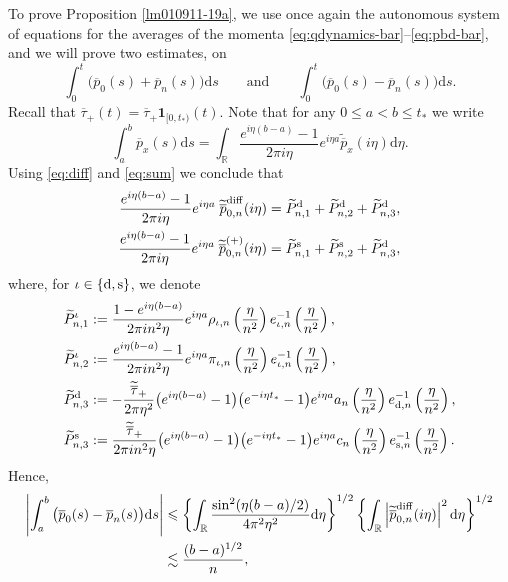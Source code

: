 \documentclass[EJP]{ejpecp} %
\newcommand\R{{\mathbb R}}
\renewcommand{\le}{\leqslant}
\newcommand{\dd  }{\mathrm{d}}
\renewcommand{\tilde}{\widetilde}
\renewcommand{\bar}{\overline}
\numberwithin{equation}{section}
\begin{document}
To prove Proposition \ref{lm010911-19a}, we use once again the autonomous system of equations for the averages of the momenta \eqref{eq:qdynamics-bar}--\eqref{eq:pbd-bar}, and we will prove two estimates, on 
\[\int_0^t\big(\bar p_0(s)+\bar p_n(s)\big)\dd s \qquad \text{and}\qquad \int_0^t\big(\bar p_0(s)-\bar p_n(s)\big)\dd s.\]
Recall that $\bar\tau_+(t)=\bar \tau_+\mathbf{1}_{[0,t_*)}(t)$. Note that for
any $0\le a<b\le t_*$ we write
\begin{equation}
\label{012412-19z}
\int_a^b\bar p_x(s)\dd s=\int_{\R}\frac{e^{i\eta
    (b-a)}-1}{2\pi i\eta}e^{i\eta a}\tilde{\bar p}_x(i\eta)\dd \eta.
\end{equation}
Using \eqref{eq:diff} and \eqref{eq:sum} we conclude that
\begin{align*}
  \frac{e^{i\eta
    (b-a)}-1}{2\pi i\eta}e^{i\eta a}\;\tilde{\bar p}^{\rm diff}_{0,n}(i\eta) & =\tilde
    P_{n,1}^{\rm d}+\tilde P_{n,2}^{\rm d}+\tilde
    P_{n,3}^{\rm d}, \\
    \frac{e^{i\eta
    (b-a)}-1}{2\pi i\eta}e^{i\eta a}\;\tilde{\bar p}^{(+)}_{0,n}(i\eta) & =\tilde
    P_{n,1}^{\rm s}+\tilde P_{n,2}^{\rm s}+\tilde
    P_{n,3}^{\rm d},
\end{align*}
where, for  $\iota\in\{{\rm d},{\rm s}\}$, we denote
\begin{align*}
     \tilde P_{n,1}^{\iota}&:= \frac{1-e^{i\eta
    (b-a)}}{2\pi i n^2 \eta}e^{i\eta a}\rho_{\iota,n}\left(\frac{\eta}{n^2}\right) e_{\iota,n}^{-1}\left(\frac{\eta}{n^2}\right),\\
 \tilde P_{n,2}^{\iota}&:=\frac{e^{i\eta
    (b-a)}-1}{2\pi i n^2 \eta}e^{i\eta a}\pi_{\iota,n}\left(\frac{\eta}{n^2}\right) e_{\iota,n}^{-1}\left(\frac{\eta}{n^2}\right), \\
 \tilde P_{n,3}^{\rm d}&:=-\frac{\tilde{\bar
    \tau}_+ }{2\pi \eta^2}\big(e^{i\eta
    (b-a)}-1\big)\big(e^{-i\eta
    t_*}-1\big)e^{i\eta a} a_n\left(\frac{\eta}{n^2}\right)
  e_{{\rm d},n}^{-1}\left(\frac{\eta}{n^2}\right),\\
 \tilde P_{n,3}^{\rm s}&:= \frac{\tilde{\bar
    \tau}_+ }{2\pi i n^2\eta} \big(e^{i\eta
    (b-a)}-1\big)\big(e^{-i\eta
    t_*}-1\big)e^{i\eta a}c_n \left(\frac{\eta}{n^2}\right) e_{{\rm s},n}^{-1}\left(\frac{\eta}{n^2}\right).
\end{align*}
Hence,
\begin{align}
\label{022412-19z}
\left|\int_a^b\big(\bar p_0(s)-\bar p_n(s)\big)\dd s\right|& \le\left\{\int_{\R}\frac{
   \sin^2(\eta (b-a)/2)}{4\pi^2\eta^2}\dd
  \eta\right\}^{1/2}\left\{\int_{\R}\left|\tilde{\bar
  p}_{0,n}^{\rm diff}(i\eta)\right|^2 \dd \eta\right\}^{1/2} \notag \\ & \lesssim \frac{ (b-a)^{1/2}}{n},
\end{align}
\end{document}
